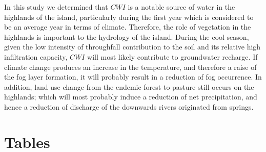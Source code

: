 \documentclass[a4paper,12pt]{article}
\begin{document}
\begin{linenumbers}
In this study we determined that $CWI$ is a notable source of water in the highlands of the island, particularly during the first year which is considered to be an average year in terms of climate. Therefore, the role of vegetation in the highlands is important to the hydrology of the island. During the cool season, given the low intensity of throughfall contribution to the soil and its relative high infiltration capacity, $CWI$ will most likely contribute to groundwater recharge. If climate change produces an increase in the temperature, and therefore a raise of the fog layer formation, it will probably result in a reduction of fog occurrence. In addition, land use change from the endemic forest to pasture still occurs on the highlands; which will most probably induce a reduction of net precipitation, and hence a reduction of discharge of the downwards rivers originated from springs.

\end{linenumbers}
\newpage





\newpage
\section{Tables}
\end{document}
